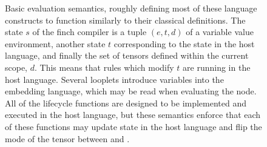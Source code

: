 \begin{figure}[b]
    \caption{Basic evaluation semantics, roughly defining most of these language
    constructs to function similarly to their classical definitions.
    The state $s$ of the finch compiler is a tuple $(e, t, d)$ of a variable value
    environment, another state $t$ corresponding to the state in the
    host language, and finally the set of tensors defined within the current scope, $d$. 
    This means that rules which modify $t$ are running in the host language.
    Several looplets introduce variables into the embedding
    language, which may be read when evaluating the {\finchvalue} node.
%
     All of the lifecycle
    functions are designed to be implemented and executed in the host language,
    but these semantics enforce that each of these functions may update state in
    the host language and flip the mode of the tensor between {\finchread} and {\finchupdate}.}
    \label{fig:semantics_core}
\end{figure}


